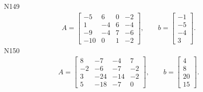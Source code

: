 \documentclass[11pt]{report}
\begin{document}
N149
\begin{align*}
 A = \left[\begin{matrix}-5 & 6 & 0 & -2\\1 & -4 & 6 & -4\\-9 & -4 & 7 & -6\\-10 & 0 & 1 & -2\end{matrix}\right],
\qquad b = \left[\begin{matrix}-1\\-5\\-4\\3\end{matrix}\right]. 
 \end{align*}
N150
\begin{align*}
 A = \left[\begin{matrix}8 & -7 & -4 & 7\\-2 & -6 & -7 & -2\\3 & -24 & -14 & -2\\5 & -18 & -7 & 0\end{matrix}\right],
\qquad b = \left[\begin{matrix}4\\8\\20\\15\end{matrix}\right]. 
 \end{align*}
\end{document}
